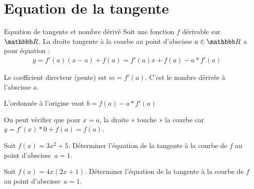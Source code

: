 \documentclass[10pt,a4paper,openany,twoside, eleve]{book}
\begin{document}

\section{Equation de la tangente}

\begin{prop}{Equation de tangente et nombre dérivé}{}
  Soit une fonction $f$ dérivable sur $\R$. La droite tangente à la courbe au point d'abscisse $a\in\R$ a pour équation :
  \begin{align*}
    y = f'(a)(x-a) + f(a) = f'(a)x + f(a)-a*f'(a)
  \end{align*}

  Le coefficient directeur (pente) est $m=f'(a)$. C'est le nombre dérivée à l'abscisse $a$.

  L'ordonnée à l'origine vaut $b=f(a)-a*f'(a)$
\end{prop}

\begin{rem}{}{}
  On peut vérifier que pour $x=a$, la droite « touche » la courbe car $y = f'(x)*0 + f(a) = f(a)$.
\end{rem}

\begin{exon}
  Soit $f(x)=3x^2+5$.
  Déterminer l'équation de la tangente à la courbe de $f$ au point
  d'abscisse~$a=1$.

  \vspace{4mm}
\end{exon}

\begin{exon}
  Soit $f(x)\!=\! 4x(2x+1)$.
  Déterminer l'équation de la tangente à la courbe de $f$ au point
  d'abscisse~$a\!=\!1$.

  \vspace{4mm}
\end{exon}
\end{document}
